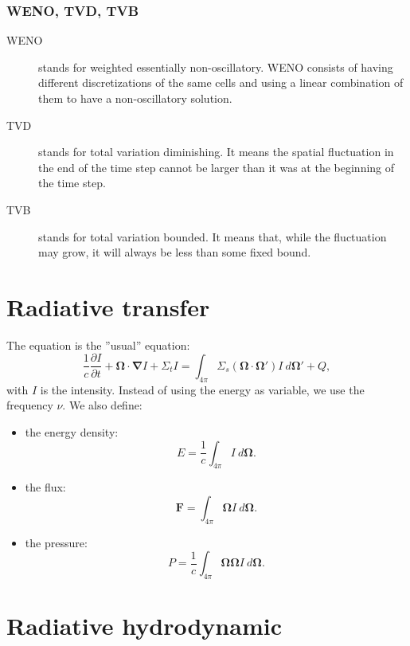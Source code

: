 \documentclass[letterpaper]{report}
\newcommand\bn{\boldsymbol{\nabla}}
\newcommand\bo{\boldsymbol{\Omega}}
\newcommand\bs{\boldsymbol}
\renewcommand{\(}{\left(}
\renewcommand{\)}{\right)}
\renewcommand{\[}{\left[}
\renewcommand{\]}{\right]}
\begin{document}
\subsubsection{WENO, TVD, TVB}
\begin{description}
  \item[WENO] stands for weighted essentially non-oscillatory. WENO consists
  of having different discretizations of the same cells and using a linear
  combination of them to have a non-oscillatory solution.
  \item[TVD] stands for total variation diminishing. It means the spatial
  fluctuation in the end of the time step cannot be larger than it was at the
  beginning of the time step.
  \item[TVB] stands for total variation bounded. It means that, while the
  fluctuation may grow, it will always be less than some fixed bound.
\end{description}

\section{Radiative transfer}
The equation is the ''usual'' equation:
\begin{equation}
  \frac{1}{c}\frac{\partial I}{\partial t} + \bo\cdot \bn I + \Sigma_t I =
  \int_{4\pi} \Sigma_s(\bo\cdot\bo') I\ d\bo' + Q,
\end{equation}
with $I$ is the intensity. Instead of using the energy as variable, we use the
frequency $\nu$.  We also define:
\begin{itemize}
  \item the energy density:
  \begin{equation}
    E = \frac{1}{c}\int_{4\pi} I\ d\bo.
  \end{equation}
  \item the flux:
  \begin{equation}
    \bs{F} = \int_{4\pi} \bo I\ d\bo.
  \end{equation}
  \item the pressure:
  \begin{equation}
    P = \frac{1}{c}\int_{4\pi}\bo\bo I\ d\bo.
  \end{equation}
\end{itemize}

\section{Radiative hydrodynamic}
\end{document}
